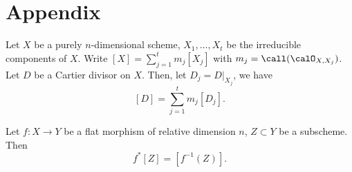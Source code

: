 \section{Appendix}

    \begin{lemma}\label{lem:restriction_of_cartier_divisor_to_irreducible_components}
        Let \(X\) be a purely \(n\)-dimensional scheme, \(X_1, \ldots, X_t\) be the irreducible components of \(X\).
        Write \([X] = \sum_{j=1}^t m_j [X_j]\) with \(m_j = \call(\calO_{X,X_j})\).
        Let \(D\) be a Cartier divisor on \(X\).
        Then, let \(D_j = D|_{X_j}\),
        we have
        \[ [D] = \sum_{j=1}^t m_j [D_j]. \]
    \end{lemma}

    \begin{lemma}\label{lem:flat_pullback_of_scheme_is_inverse_image}
        Let \(f: X \to Y\) be a flat morphism of relative dimension \(n\), 
        \(Z \subset Y\) be a subscheme.
        Then 
        \[ f^*[Z] = [f^{-1}(Z)]. \]
    \end{lemma}